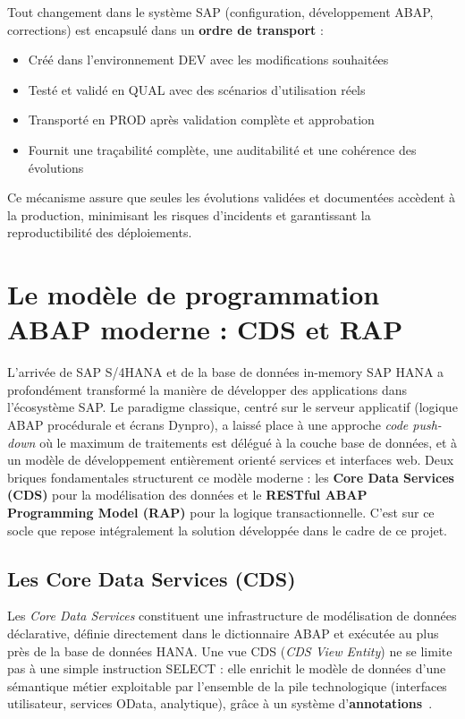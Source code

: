 \documentclass[12pt,a4paper,oneside]{report}
\begin{document}
Tout changement dans le système SAP (configuration, développement ABAP, corrections) est encapsulé dans un \textbf{ordre de transport} :

\begin{itemize}[label=---, itemsep=0.15em]
	\item Créé dans l'environnement DEV avec les modifications souhaitées
	\item Testé et validé en QUAL avec des scénarios d'utilisation réels
	\item Transporté en PROD après validation complète et approbation
	\item Fournit une traçabilité complète, une auditabilité et une cohérence des évolutions
\end{itemize}

Ce mécanisme assure que seules les évolutions validées et documentées accèdent à la production, minimisant
les risques d'incidents et garantissant la reproductibilité des déploiements.


\section{Le modèle de programmation ABAP moderne : CDS et RAP}\label{ch2:cds-rap}

L'arrivée de SAP S/4HANA et de la base de données in-memory SAP HANA a profondément
transformé la manière de développer des applications dans l'écosystème SAP. Le
paradigme classique, centré sur le serveur applicatif (logique ABAP procédurale et
écrans Dynpro), a laissé place à une approche \textit{code push-down} où le maximum de
traitements est délégué à la couche base de données, et à un modèle de développement
entièrement orienté services et interfaces web. Deux briques fondamentales structurent
ce modèle moderne : les \textbf{Core Data Services (CDS)} pour la modélisation des
données et le \textbf{RESTful ABAP Programming Model (RAP)} pour la logique
transactionnelle. C'est sur ce socle que repose intégralement la solution développée
dans le cadre de ce projet.

\subsection{Les Core Data Services (CDS)}\label{ch2:cds}

Les \textit{Core Data Services} constituent une infrastructure de modélisation de
données déclarative, définie directement dans le dictionnaire ABAP et exécutée au plus
près de la base de données HANA. Une vue CDS (\textit{CDS View Entity}) ne se limite pas
à une simple instruction SELECT : elle enrichit le modèle de données d'une sémantique
métier exploitable par l'ensemble de la pile technologique (interfaces utilisateur,
services OData, analytique), grâce à un système d'\textbf{annotations}~\cite{sap-cds}.
\end{document}
